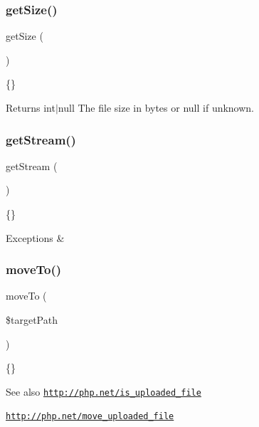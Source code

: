 \subsubsection{\texorpdfstring{get\+Size()}{getSize()}}
{\footnotesize\ttfamily get\+Size (\begin{DoxyParamCaption}{ }\end{DoxyParamCaption})}

\{\}

\begin{DoxyReturn}{Returns}
int$\vert$null The file size in bytes or null if unknown. 
\end{DoxyReturn}
\mbox{\label{class_pes_1_1_http_1_1_uploaded_file_a3e5834ff3daeecd091712270886a16fb}} 
\subsubsection{\texorpdfstring{get\+Stream()}{getStream()}}
{\footnotesize\ttfamily get\+Stream (\begin{DoxyParamCaption}{ }\end{DoxyParamCaption})}

\{\} 
\begin{DoxyExceptions}{Exceptions}
{\em } & \\
\hline
\end{DoxyExceptions}
\mbox{\label{class_pes_1_1_http_1_1_uploaded_file_aeb023efe2fe8021dc83b523bac55a9a3}} 
\subsubsection{\texorpdfstring{move\+To()}{moveTo()}}
{\footnotesize\ttfamily move\+To (\begin{DoxyParamCaption}\item[{}]{\$target\+Path }\end{DoxyParamCaption})}

\{\}

\begin{DoxySeeAlso}{See also}
\href{http://php.net/is_uploaded_file}{\tt http\+://php.\+net/is\+\_\+uploaded\+\_\+file} 

\href{http://php.net/move_uploaded_file}{\tt http\+://php.\+net/move\+\_\+uploaded\+\_\+file} 
\end{DoxySeeAlso}

